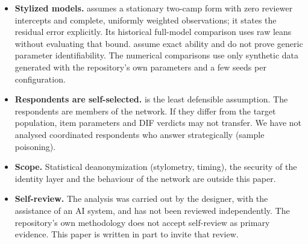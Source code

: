 \begin{itemize}
  \item \textbf{Stylized models.}  assumes a stationary two-camp form with zero
    reviewer intercepts and complete, uniformly weighted observations; it states the residual
    error explicitly. Its historical full-model comparison uses raw leans without evaluating
    that bound.  assume exact ability and do not prove generic
    parameter identifiability. The numerical comparisons use only synthetic data generated with
    the repository's own parameters and a few seeds per configuration.
  \item \textbf{Respondents are self-selected.}  is the least defensible
    assumption. The respondents are members of the network. If they differ from the target
    population, item parameters and DIF verdicts may not transfer. We have not analysed
    coordinated respondents who answer strategically (sample poisoning).
  \item \textbf{Scope.} Statistical deanonymization (stylometry, timing), the security of the
    identity layer and the behaviour of the network are outside this paper.
  \item \textbf{Self-review.} The analysis was carried out by the designer, with the assistance
    of an AI system, and has not been reviewed independently. The repository's own methodology
    does not accept self-review as primary evidence. This paper is written in part to invite that
    review.
\end{itemize}

